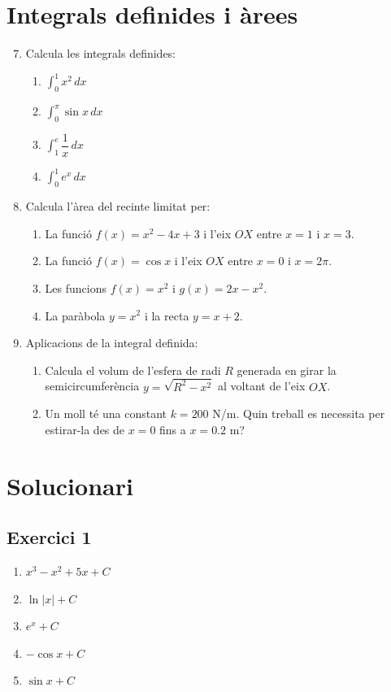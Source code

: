 \documentclass[12pt]{article}
\begin{document}
\section*{Integrals definides i àrees}

\begin{enumerate}[label=\arabic*.]
    \setcounter{enumi}{6}
    \item Calcula les integrals definides:
    \begin{enumerate}[label=\alph*)]
        \item $\displaystyle \int_0^1 x^2\,dx$
        \item $\displaystyle \int_0^\pi \sin x\,dx$
        \item $\displaystyle \int_1^e \dfrac{1}{x}\,dx$
        \item $\displaystyle \int_0^1 e^x\,dx$
    \end{enumerate}

    \item Calcula l'àrea del recinte limitat per:
    \begin{enumerate}[label=\alph*)]
        \item La funció $f(x)=x^2-4x+3$ i l'eix $OX$ entre $x=1$ i $x=3$.
        \item La funció $f(x)=\cos x$ i l'eix $OX$ entre $x=0$ i $x=2\pi$.
        \item Les funcions $f(x)=x^2$ i $g(x)=2x-x^2$.
        \item La paràbola $y=x^2$ i la recta $y=x+2$.
    \end{enumerate}

    \item Aplicacions de la integral definida:
    \begin{enumerate}[label=\alph*)]
        \item Calcula el volum de l'esfera de radi $R$ generada en girar la semicircumferència $y=\sqrt{R^2-x^2}$ al voltant de l'eix $OX$.
        \item Un moll té una constant $k=200$ N/m. Quin treball es necessita per estirar-la des de $x=0$ fins a $x=0.2$ m?
    \end{enumerate}
\end{enumerate}

\newpage

\section*{Solucionari}

\subsection*{Exercici 1}
\begin{enumerate}[label=\alph*)]
    \item $x^3-x^2+5x+C$
    \item $\ln|x|+C$
    \item $e^x+C$
    \item $-\cos x+C$
    \item $\sin x+C$
\end{enumerate}
\end{document}
